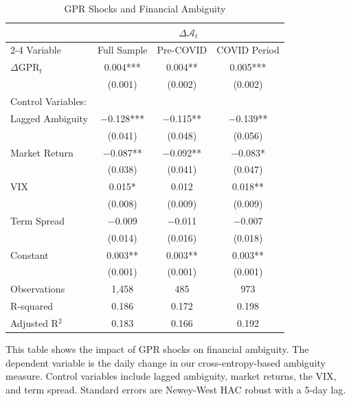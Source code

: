 \documentclass[preprint,12pt,authoryear]{elsarticle}
\begin{document}
\begin{table}[htbp]
\centering
\caption{GPR Shocks and Financial Ambiguity}
\label{tab:gpr_ambiguity}
\begin{threeparttable}
\begin{tabular*}{\textwidth}{@{\extracolsep{\fill}} lccc @{\extracolsep{\fill}}}
\toprule
& \multicolumn{3}{c}{$\Delta \mathcal{A}_{t}$} \\
\cmidrule(lr){2-4}
Variable & Full Sample & Pre-COVID & COVID Period \\
\midrule
\midrule
$\Delta$GPR$_t$ & 0.004*** & 0.004** & 0.005*** \\
& (0.001) & (0.002) & (0.002) \\
\midrule
Control Variables: & & & \\
Lagged Ambiguity & $-$0.128*** & $-$0.115** & $-$0.139** \\
& (0.041) & (0.048) & (0.056) \\
Market Return & $-$0.087** & $-$0.092** & $-$0.083* \\
& (0.038) & (0.041) & (0.047) \\
VIX & 0.015* & 0.012 & 0.018** \\
& (0.008) & (0.009) & (0.009) \\
Term Spread & $-$0.009 & $-$0.011 & $-$0.007 \\
& (0.014) & (0.016) & (0.018) \\
\midrule
Constant & 0.003** & 0.003** & 0.003** \\
& (0.001) & (0.001) & (0.001) \\
\midrule
Observations & 1,458 & 485 & 973 \\
R-squared & 0.186 & 0.172 & 0.198 \\
Adjusted R$^2$ & 0.183 & 0.166 & 0.192 \\
\bottomrule
\end{tabular*}
\begin{tablenotes}[flushleft]
\small
\item[] This table shows the impact of GPR shocks on financial ambiguity. The dependent variable is the daily change in our cross-entropy-based ambiguity measure. Control variables include lagged ambiguity, market returns, the VIX, and term spread. Standard errors are Newey-West HAC robust with a 5-day lag.
\end{tablenotes}
\end{threeparttable}
\end{table}
\end{document}
